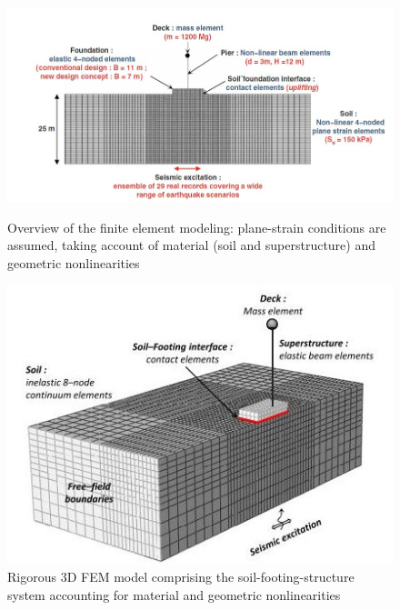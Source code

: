 \documentclass[12pt,a4paper]{report}
\begin{document}
\begin{figure}[!h]
	\centering
	\begin{minipage}[b]{0.45\textwidth}
		\includegraphics[width=\textwidth]{scheme2D}
		\caption{Overview of the finite element modeling: plane-strain conditions are assumed, taking account of material (soil and superstructure) and geometric nonlinearities}
		\label{2d}
	\end{minipage}
	\hfill
	\begin{minipage}[b]{0.45\textwidth}
		\includegraphics[width=\textwidth]{3d_model}
		\caption{Rigorous 3D FEM model comprising the soil-footing-structure system accounting for material and geometric nonlinearities}
		\label{3d}
	\end{minipage}
\end{figure} 

\newpage
\end{document}
